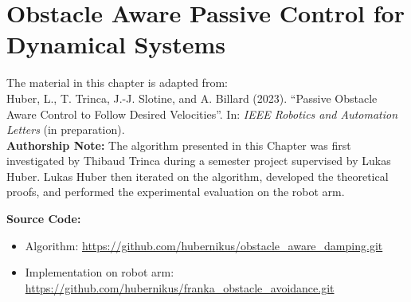 \chapter{Obstacle Aware Passive Control for Dynamical Systems} \label{chap:passivity_aware_damping}
% 
% 
\begin{publicationbox}
	The material in this chapter is adapted from: \\
	Huber, L., T. Trinca, J.-J. Slotine, and A. Billard (2023). “Passive Obstacle Aware Control to Follow Desired Velocities”. In: \textit{IEEE Robotics and Automation Letters} (in preparation). \\

\textbf{Authorship Note:}
 The algorithm presented in this Chapter was first investigated by Thibaud Trinca during a semester project supervised by Lukas Huber.
 Lukas Huber then iterated on the algorithm, developed the theoretical proofs, and performed the experimental evaluation on the robot arm.

\textbf{Source Code:}
\begin{itemize}
	\setlength\itemsep{-0.0em}
\item Algorithm:
	\url{https://github.com/hubernikus/obstacle_aware_damping.git}
\item Implementation on robot arm: \\
	\url{https://github.com/hubernikus/franka_obstacle_avoidance.git} 
\end{itemize}


\end{publicationbox}


